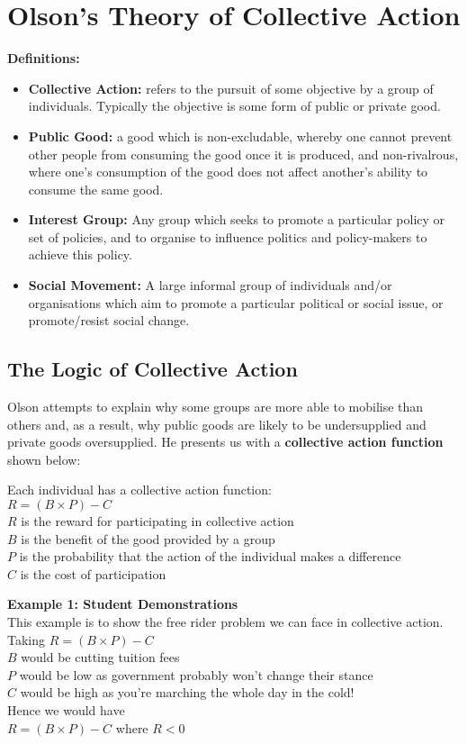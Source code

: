 \documentclass[12pt, letterpaper]{article}
\begin{document}
\newpage
\section{Olson's Theory of Collective Action}
\textbf{Definitions:} 
\begin{itemize}	
	\item \textbf{Collective Action:} refers to the pursuit of some objective by a group of individuals. Typically the objective is some form of public or private good.
	\item \textbf{Public Good:} a good which is non-excludable, whereby one cannot prevent other people from consuming the good once it is produced, and non-rivalrous, where one's consumption of the good does not affect another's ability to consume the same good.
	\item \textbf{Interest Group:} Any group which seeks to promote a particular policy or set of policies, and to organise to influence politics and policy-makers to achieve this policy.
	\item \textbf{Social Movement:} A large informal group of individuals and/or organisations which aim to promote a particular political or social issue, or promote/resist social change.

\end{itemize}

\subsection{The Logic of Collective Action}
Olson attempts to explain why some groups are more able to mobilise than others and, as a result, why public goods are likely to be undersupplied and private goods oversupplied. He presents us with a \textbf{collective action function} shown below:

\begin{center}
Each individual has a collective action function: \\
$R=(B \times P) - C$ \\
$R$ is the reward for participating in collective action \\
$B$ is the benefit of the good provided by a group \\
$P$ is the probability that the action of the individual makes a difference \\
$C$ is the cost of participation
\end{center}

\begin{center}
\textbf{Example 1: Student Demonstrations} \\
This example is to show the free rider problem we can face in collective action. \\
Taking $R=(B \times P) - C$ \\
$B$ would be cutting tuition fees \\
$P$ would be low as government probably won't change their stance \\
$C$ would be high as you're marching the whole day in the cold! \\
Hence we would have \\
$R=(B \times P) - C$ where $R<0$
\end{center}
\end{document}
